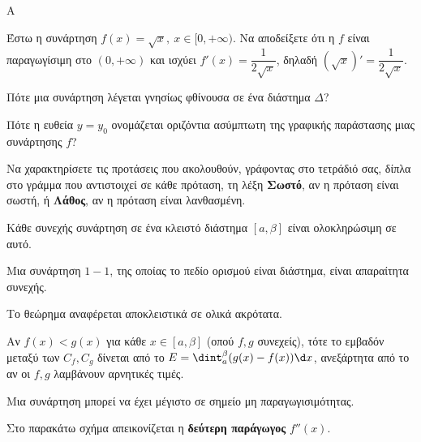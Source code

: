 \begin{thema}{A}
\begin{erwthma}
    \item {Έστω η συνάρτηση $ f(x)=\sqrt{x},\ x\in[0,+\infty) $. Να αποδείξετε ότι η $ f $ είναι παραγωγίσιμη στο $ (0,+\infty) $ και ισχύει $ f'(x)=\dfrac{1}{2\sqrt{x}} $, δηλαδή $ \left(\sqrt{x}\right)'=\dfrac{1}{2\sqrt{x}} $.}
    \item Πότε μια συνάρτηση λέγεται γνησίως φθίνουσα σε ένα διάστημα $\Delta$?
    \item Πότε η ευθεία $y=y_0$ ονομάζεται οριζόντια ασύμπτωτη της γραφικής παράστασης μιας συνάρτησης $f$?
    \item Να χαρακτηρίσετε τις προτάσεις που ακολουθούν, γράφοντας στο τετράδιό σας, δίπλα στο γράμμα που αντιστοιχεί σε κάθε πρόταση, τη λέξη \textbf{Σωστό}, αν η πρόταση είναι σωστή, ή \textbf{Λάθος}, αν η πρόταση είναι λανθασμένη.
    \begin{alist}
        \item Κάθε συνεχής συνάρτηση σε ένα κλειστό διάστημα $[a, \beta]$ είναι ολοκληρώσιμη σε αυτό.
        \item Μια συνάρτηση $1-1$, της οποίας το πεδίο ορισμού είναι διάστημα, είναι απαραίτητα συνεχής.
        \item Το θεώρημα {} αναφέρεται αποκλειστικά σε ολικά ακρότατα.
        \item Αν $f(x)<g(x)$ για κάθε $x \in [a, \beta]$ (οπού $f,g$ συνεχείς), τότε το εμβαδόν μεταξύ των $C_f, C_g$ δίνεται από το $E = \dint_a^\beta (g(x)-f(x))\d x$, ανεξάρτητα από το αν οι $f, g$ λαμβάνουν αρνητικές τιμές.
        \item Μια συνάρτηση μπορεί να έχει μέγιστο σε σημείο μη παραγωγισιμότητας.
    \end{alist}
    \item Στο παρακάτω σχήμα απεικονίζεται η \textbf{δεύτερη παράγωγος} $f''(x)$. 
    \begin{center}
\end{center}
\end{erwthma}
\end{thema}

